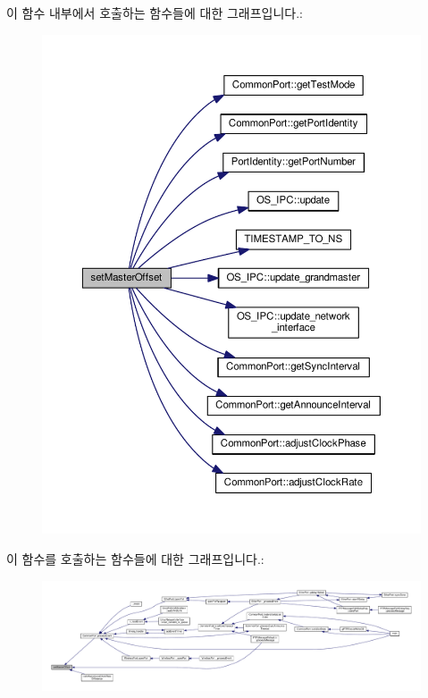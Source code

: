이 함수 내부에서 호출하는 함수들에 대한 그래프입니다.\+:
\nopagebreak
\begin{figure}[H]
\begin{center}
\leavevmode
\includegraphics[width=350pt]{class_i_e_e_e1588_clock_a6e4391235823b250e5dbf6df39b27476_cgraph}
\end{center}
\end{figure}




이 함수를 호출하는 함수들에 대한 그래프입니다.\+:
\nopagebreak
\begin{figure}[H]
\begin{center}
\leavevmode
\includegraphics[width=350pt]{class_i_e_e_e1588_clock_a6e4391235823b250e5dbf6df39b27476_icgraph}
\end{center}
\end{figure}


